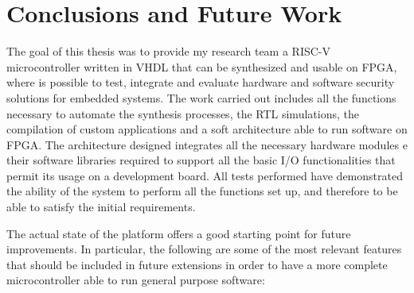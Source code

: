 \chapter{Conclusions and Future Work}
The goal of this thesis was to provide my research team a RISC-V microcontroller written in VHDL that can be synthesized and usable on FPGA, where is possible to test, integrate and evaluate hardware and software security solutions for embedded systems. The work carried out includes all the functions necessary to automate the synthesis processes, the RTL simulations, the compilation of custom applications and a soft architecture able to run software on FPGA. The architecture designed integrates all the necessary hardware modules e their software libraries required to support all the basic I/O functionalities that permit its usage on a development board. All tests performed have demonstrated the ability of the system to perform all the functions set up, and therefore to be able to satisfy the initial requirements.

The actual state of the platform offers a good starting point for future improvements. In particular, the following are some of the most relevant features that should be included in future extensions in order to have a more complete microcontroller able to run general purpose software:

